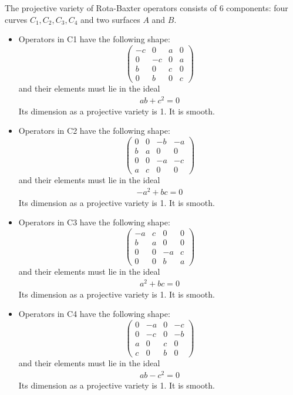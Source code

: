 \documentclass{amsart}
\begin{document}
The projective variety of Rota-Baxter operators consists of 6 components: four curves $C_1, C_2, C_3, C_4$ and two surfaces $A$ and $B$.
\begin{itemize}
\item
Operators in C1 have the following shape:
$$\left(\begin{array}{rrrr}
-c & 0 & a & 0 \\
0 & -c & 0 & a \\
b & 0 & c & 0 \\
0 & b & 0 & c
\end{array}\right)$$
and their elements must lie in the ideal \begin{align*}
a b + c^{2} = 0 
\end{align*}
Its dimension as a projective variety is 1.
It is smooth.

\item
Operators in C2 have the following shape:
$$\left(\begin{array}{rrrr}
0 & 0 & -b & -a \\
b & a & 0 & 0 \\
0 & 0 & -a & -c \\
a & c & 0 & 0
\end{array}\right)$$
and their elements must lie in the ideal \begin{align*}
-a^{2} + b c = 0 
\end{align*}
Its dimension as a projective variety is 1.
It is smooth.

\item
Operators in C3 have the following shape:
$$\left(\begin{array}{rrrr}
-a & c & 0 & 0 \\
b & a & 0 & 0 \\
0 & 0 & -a & c \\
0 & 0 & b & a
\end{array}\right)$$
and their elements must lie in the ideal \begin{align*}
a^{2} + b c = 0 
\end{align*}
Its dimension as a projective variety is 1.
It is smooth.

\item
Operators in C4 have the following shape:
$$\left(\begin{array}{rrrr}
0 & -a & 0 & -c \\
0 & -c & 0 & -b \\
a & 0 & c & 0 \\
c & 0 & b & 0
\end{array}\right)$$
and their elements must lie in the ideal \begin{align*}
a b - c^{2} = 0 
\end{align*}
Its dimension as a projective variety is 1.
It is smooth.


\end{itemize}
\end{document}
